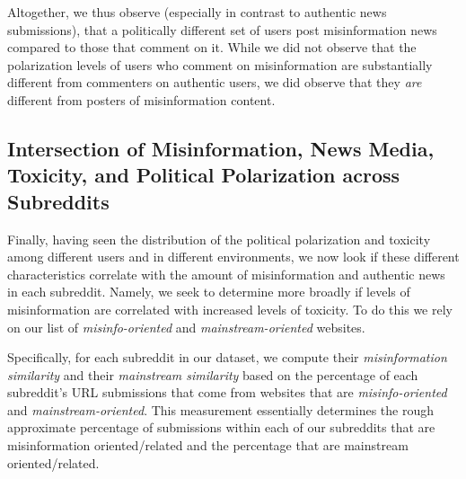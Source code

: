 Altogether, we thus observe (especially in contrast to authentic news submissions), that a politically different set of users post misinformation news compared to those that comment on it. While we did not observe that the polarization levels of users who comment on misinformation are substantially different from commenters on authentic users, we did observe that they \emph{are} different from posters of misinformation content. 

\subsection{Intersection of Misinformation, News Media, Toxicity, and Political Polarization across Subreddits}
Finally, having seen the distribution of the political polarization and toxicity among different users and in different environments, we now look if these different characteristics correlate with the amount of misinformation and authentic news in each subreddit. Namely, we seek to determine more broadly if levels of misinformation are correlated with increased levels of toxicity. To do this we rely on our list of \textit{misinfo-oriented} and \textit{mainstream-oriented} websites.



Specifically, for each subreddit in our dataset, we compute their \textit{misinformation similarity} and their \textit{mainstream similarity} based on the percentage of each subreddit's  URL submissions that come from websites that are \textit{misinfo-oriented} and \textit{mainstream-oriented}. This measurement essentially determines the rough approximate percentage of submissions within each of our subreddits that are misinformation oriented/related and the percentage that are mainstream oriented/related. 

